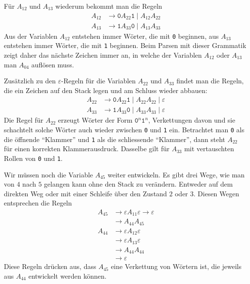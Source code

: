 \begin{loesung}
Für $A_{12}$ und $A_{13}$ wiederum bekommt man die Regeln
\begin{equation}
\begin{aligned}
A_{12}&\to\texttt{0} A_{22}\texttt{1} \mid  A_{12}A_{22}\\
A_{13}&\to\texttt{1} A_{33}\texttt{0} \mid  A_{13}A_{33}
\end{aligned}
\label{40000041:a12a13}
\end{equation}
Aus der Variablen $A_{12}$ entstehen immer Wörter, die mit \texttt{0}
beginnen, aus $A_{13}$ entstehen immer Wörter, die mit \texttt{1}
beginnen.
Beim Parsen mit dieser Grammatik zeigt daher das nächste Zeichen
immer an, in welche der Variablen $A_{12}$ oder $A_{13}$ man $A_{04}$
auflösen muss.

Zusätzlich zu den $\varepsilon$-Regeln für die Variablen $A_{22}$ und $A_{33}$
findet man die Regeln, die ein Zeichen auf den Stack legen und am
Schluss wieder abbauen:
\begin{equation}
\begin{aligned}
A_{22}&\to \texttt{0}A_{22}\texttt{1} \mid  A_{22}A_{22} \mid  \varepsilon\\
A_{33}&\to \texttt{1}A_{33}\texttt{0} \mid  A_{33}A_{33} \mid  \varepsilon
\end{aligned}
\label{40000041:a22a33}
\end{equation}
Die Regel für $A_{22}$ erzeugt Wörter der Form
$\texttt{0}^n\texttt{1}^n$,
Verkettungen davon und sie schachtelt solche Wörter auch wieder zwischen
\texttt{0} und \texttt{1} ein.
Betrachtet man \texttt{0} als die öffnende ``Klammer'' und \texttt{1}
als die schliessende ``Klammer'', dann steht $A_{22}$ für einen
korrekten Klammerausdruck.
Dasselbe gilt für $A_{33}$ mit vertauschten Rollen von \texttt{0}
und \texttt{1}.

Wir müssen noch die Variable $A_{45}$ weiter entwickeln. Es gibt
drei Wege, wie man von $4$ nach $5$ gelangen kann ohne den
Stack zu verändern. Entweder auf dem direkten Weg oder mit
einer Schleife über den Zustand $2$ oder $3$.
Diesen Wegen entsprechen die Regeln
\begin{align*}
A_{45}&\to\varepsilon A_{11}\varepsilon\to\varepsilon\\
      &\to A_{44}A_{45}\\
A_{44}&\to\varepsilon A_{12}\varepsilon\\
      &\to\varepsilon A_{13}\varepsilon\\
      &\to A_{44}A_{44}\\
      &\to\varepsilon
\end{align*}
Diese Regeln drücken aus, dass $A_{45}$ eine Verkettung von Wörtern
ist, die jeweils aus $A_{44}$ entwickelt werden können.


\end{loesung}

